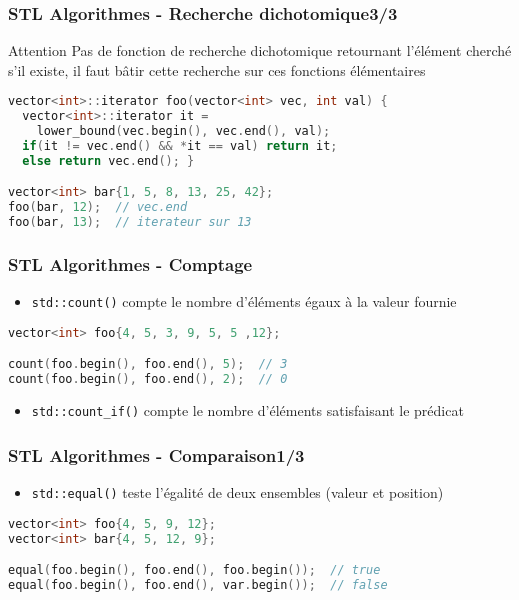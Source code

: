 \documentclass[C++.tex]{subfiles}
\begin{document}
\begin{frame}[fragile]
	\frametitle{STL Algorithmes - Recherche dichotomique\titlehfill{}3/3}
	\begin{alertblock}{Attention}
		Pas de fonction de recherche dichotomique retournant l'élément cherché s'il existe, il faut bâtir cette recherche sur ces fonctions élémentaires
	\end{alertblock}

	\begin{lstlisting}[language=C++]
vector<int>::iterator foo(vector<int> vec, int val) {
  vector<int>::iterator it = 
    lower_bound(vec.begin(), vec.end(), val);
  if(it != vec.end() && *it == val) return it;
  else return vec.end(); }

vector<int> bar{1, 5, 8, 13, 25, 42};
foo(bar, 12);  // vec.end
foo(bar, 13);  // iterateur sur 13
\end{lstlisting}
\end{frame}

\begin{frame}[fragile]
	\frametitle{STL Algorithmes - Comptage}
	\begin{itemize}
		\item \lstinline|std::count()| compte le nombre d'éléments égaux à la valeur fournie
	\end{itemize}

	\begin{lstlisting}[language=C++]
vector<int> foo{4, 5, 3, 9, 5, 5 ,12};

count(foo.begin(), foo.end(), 5);  // 3
count(foo.begin(), foo.end(), 2);  // 0\end{lstlisting}

	\begin{itemize}
		\item \lstinline|std::count_if()| compte le nombre d'éléments satisfaisant le prédicat
	\end{itemize}
\end{frame}

\begin{frame}[fragile]
	\frametitle{STL Algorithmes - Comparaison\titlehfill{}1/3}
	\begin{itemize}
		\item \lstinline|std::equal()| teste l'égalité de deux ensembles (valeur et position)
	\end{itemize}


	\begin{lstlisting}[language=C++]
vector<int> foo{4, 5, 9, 12};
vector<int> bar{4, 5, 12, 9};

equal(foo.begin(), foo.end(), foo.begin());  // true
equal(foo.begin(), foo.end(), var.begin());  // false\end{lstlisting}
\end{frame}
\end{document}

